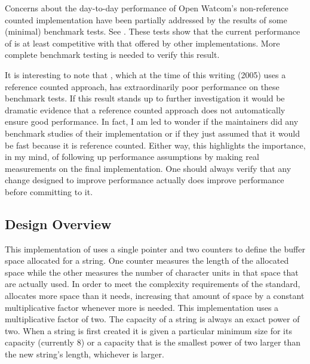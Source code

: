 
Concerns about the day-to-day performance of Open Watcom's non-reference
counted implementation have been partially addressed by the results of some
(minimal) benchmark tests. See . These tests show
that the current performance of  is at least competitive
with that offered by other implementations. More complete benchmark testing is
needed to verify this result.

It is interesting to note that , which at the time of this writing
(2005) uses a reference counted approach, has extraordinarily poor performance
on these benchmark tests. If this result stands up to further investigation it
would be dramatic evidence that a reference counted approach does not
automatically ensure good performance. In fact, I am led to wonder if the
 maintainers did any benchmark studies of their implementation or if
they just assumed that it would be fast because it is reference counted.
Either way, this highlights the importance, in my mind, of following up
performance assumptions by making real measurements on the final
implementation. One should always verify that any change designed to improve
performance actually does improve performance before committing to it.

\subsection{Design Overview}

This implementation of  uses a single pointer and two
counters to define the buffer space allocated for a string. One counter
measures the length of the allocated space while the other measures the number
of character units in that space that are actually used. In order to meet the
complexity requirements of the standard,  allocates more space
than it needs, increasing that amount of space by a constant multiplicative
factor whenever more is needed. This implementation uses a multiplicative
factor of two.  The capacity of a string is always an exact power
of two. When a string is first created it is given a particular minimum size
for its capacity (currently 8) or a capacity that is the smallest power of two
larger than the new string's length, whichever is larger.

